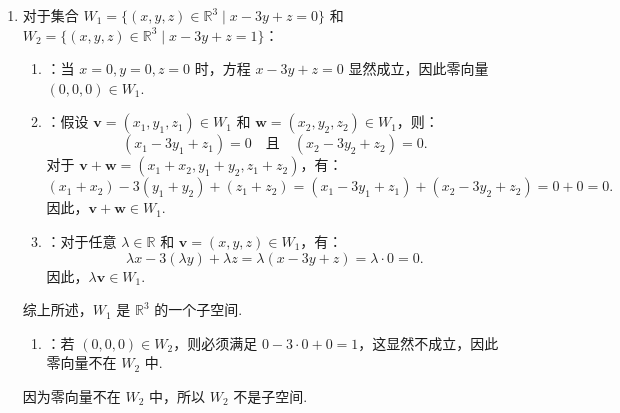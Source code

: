 \begin{exercise}
\begin{exgroup}
\begin{answer}
\begin{enumerate}
\begin{enumerate}
                    \begin{itemize}
                        \item {}：当 \( x = 0, y = 0 \) 时，向量 \( (0, 0, 0) \in W_2 \).
                        \item {}：假设 \( \mathbf{v} = (x_1, y_1, 0) \in W_2 \) 和 \( \mathbf{w} = (x_2, y_2, 0) \in W_2 \)，则：
                        \[
                        \mathbf{v} + \mathbf{w} = (x_1 + x_2, y_1 + y_2, 0) \in W_2.
                        \]
                        \item {}：对于 \( \lambda \in \mathbb{R} \) 和 \( \mathbf{v} = (x, y, 0) \in W_2 \)，有：
                        \[
                        \lambda \mathbf{v} = (\lambda x, \lambda y, 0) \in W_2.
                        \]
                    \end{itemize}
                \end{enumerate}

                因此，\( W_2 \) 是 \( \mathbb{R}^3 \) 的一个子空间.

                \item 对于集合 $W_1 = \{(x, y, z) \in \mathbb{R}^3 \mid x - 3y + z = 0\}$ 和 $W_2 = \{(x, y, z) \in \mathbb{R}^3 \mid x - 3y + z = 1\}$：
                \begin{enumerate}
                    \item {}：当 $x = 0, y = 0, z = 0$ 时，方程 $x - 3y + z = 0$ 显然成立，因此零向量 $(0, 0, 0) \in W_1$.
                    \item {}：假设 $\mathbf{v} = (x_1, y_1, z_1) \in W_1$ 和 $\mathbf{w} = (x_2, y_2, z_2) \in W_1$，则：
                    \[
                    (x_1 - 3y_1 + z_1) = 0 \quad \text{且} \quad (x_2 - 3y_2 + z_2) = 0.
                    \]
                    对于 $\mathbf{v} + \mathbf{w} = (x_1 + x_2, y_1 + y_2, z_1 + z_2)$，有：
                    \[
                    (x_1 + x_2) - 3(y_1 + y_2) + (z_1 + z_2) = (x_1 - 3y_1 + z_1) + (x_2 - 3y_2 + z_2) = 0 + 0 = 0.
                    \]
                    因此，$\mathbf{v} + \mathbf{w} \in W_1$.
                    \item {}：对于任意 $\lambda \in \mathbb{R}$ 和 $\mathbf{v} = (x, y, z) \in W_1$，有：
                    \[
                    \lambda x - 3(\lambda y) + \lambda z = \lambda(x - 3y + z) = \lambda \cdot 0 = 0.
                    \]
                    因此，$\lambda \mathbf{v} \in W_1$.
                \end{enumerate}
                综上所述，$W_1$ 是 $\mathbb{R}^3$ 的一个子空间.
                \begin{enumerate}
                    \item {}：若 $(0, 0, 0) \in W_2$，则必须满足 $0 - 3 \cdot 0 + 0 = 1$，这显然不成立，因此零向量不在 $W_2$ 中.
                \end{enumerate}
                因为零向量不在 $W_2$ 中，所以 $W_2$ 不是子空间.


\end{enumerate}
\end{answer}
\end{exgroup}
\end{exercise}
